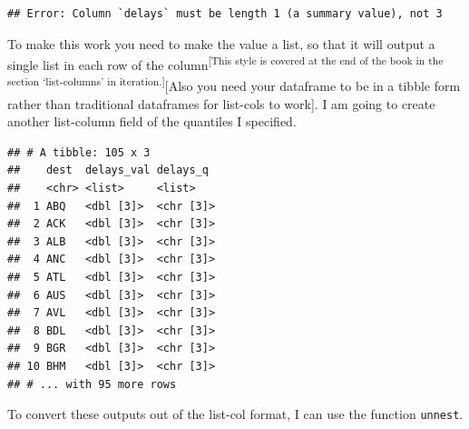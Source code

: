 \documentclass[]{book}
\newenvironment{Shaded}{\begin{snugshade}}{\end{snugshade}}
\newcommand{\DataTypeTok}[1]{\textcolor[rgb]{0.13,0.29,0.53}{#1}}
\newcommand{\FloatTok}[1]{\textcolor[rgb]{0.00,0.00,0.81}{#1}}
\newcommand{\KeywordTok}[1]{\textcolor[rgb]{0.13,0.29,0.53}{\textbf{#1}}}
\newcommand{\NormalTok}[1]{#1}
\newcommand{\OperatorTok}[1]{\textcolor[rgb]{0.81,0.36,0.00}{\textbf{#1}}}
\newcommand{\OtherTok}[1]{\textcolor[rgb]{0.56,0.35,0.01}{#1}}
\newcommand{\StringTok}[1]{\textcolor[rgb]{0.31,0.60,0.02}{#1}}
\theoremstyle{definition}
\theoremstyle{definition}
\theoremstyle{definition}
\theoremstyle{remark}
\begin{document}
\begin{verbatim}
## Error: Column `delays` must be length 1 (a summary value), not 3
\end{verbatim}

To make this work you need to make the value a list, so that it will
output a single list in each row of the column\textsuperscript{{[}This
style is covered at the end of the book in the section `list-columns' in
iteration.{]}}{[}Also you need your dataframe to be in a tibble form
rather than traditional dataframes for list-cols to work{]}. I am going
to create another list-column field of the quantiles I specified.

\begin{Shaded}
\end{Shaded}

\begin{verbatim}
## # A tibble: 105 x 3
##    dest  delays_val delays_q 
##    <chr> <list>     <list>   
##  1 ABQ   <dbl [3]>  <chr [3]>
##  2 ACK   <dbl [3]>  <chr [3]>
##  3 ALB   <dbl [3]>  <chr [3]>
##  4 ANC   <dbl [3]>  <chr [3]>
##  5 ATL   <dbl [3]>  <chr [3]>
##  6 AUS   <dbl [3]>  <chr [3]>
##  7 AVL   <dbl [3]>  <chr [3]>
##  8 BDL   <dbl [3]>  <chr [3]>
##  9 BGR   <dbl [3]>  <chr [3]>
## 10 BHM   <dbl [3]>  <chr [3]>
## # ... with 95 more rows
\end{verbatim}

To convert these outputs out of the list-col format, I can use the
function \texttt{unnest}.
\end{document}
